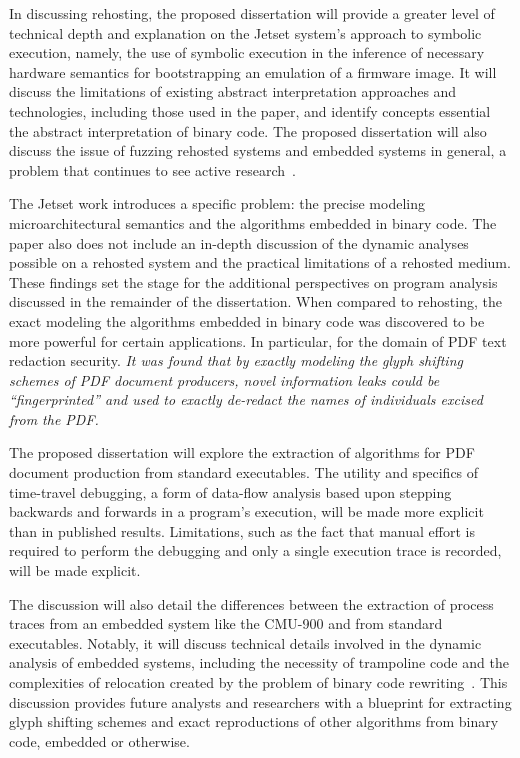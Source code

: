 In discussing rehosting, the proposed dissertation will provide a greater level of technical depth and explanation on the Jetset system's approach to symbolic execution, namely, the use of symbolic execution in the inference of necessary hardware semantics for bootstrapping an emulation of a firmware image.
It will discuss the limitations of existing abstract interpretation approaches and technologies, including those used in the paper, and identify concepts essential the abstract interpretation of binary code.
The proposed dissertation will also discuss the issue of fuzzing rehosted systems and embedded systems in general, a problem that continues to see active research~\cite{zhu2022fuzzing}.

The Jetset work introduces a specific problem: the precise modeling microarchitectural semantics and the algorithms embedded in binary code.
The paper also does not include an in-depth discussion of the dynamic analyses possible on a rehosted system and the practical limitations of a rehosted medium.
These findings set the stage for the additional perspectives on program analysis discussed in the remainder of the dissertation.
When compared to rehosting, the exact modeling the algorithms embedded in binary code was discovered to be more powerful for certain applications.
In particular, for the domain of PDF text redaction security.
\emph{It was found that by exactly modeling the glyph shifting schemes of PDF document producers, novel information leaks could be ``fingerprinted'' and used to exactly de-redact the names of individuals excised from the PDF.}

The proposed dissertation will explore the extraction of algorithms for PDF document production from standard executables.
The utility and specifics of time-travel debugging, a form of data-flow analysis based upon stepping backwards and forwards in a program's execution, will be made more explicit than in published results.
Limitations, such as the fact that manual effort is required to perform the debugging and only a single execution trace is recorded, will be made explicit.

The discussion will also detail the differences between the extraction of process traces from an embedded system like the CMU-900 and from standard executables.
Notably, it will discuss technical details involved in the dynamic analysis of embedded systems, including the necessity of trampoline code and the complexities of relocation created by the problem of binary code rewriting~\cite{wenzl2019hack}.
This discussion provides future analysts and researchers with a blueprint for extracting glyph shifting schemes and exact reproductions of other algorithms from binary code, embedded or otherwise.


